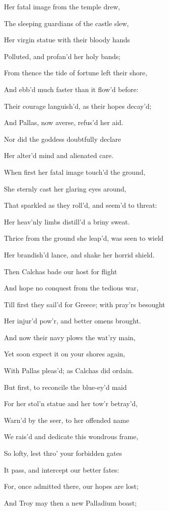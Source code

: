 Her fatal image from the temple drew,

The sleeping guardians of the castle slew,

Her virgin statue with their bloody hands

Polluted, and profan’d her holy bands;

From thence the tide of fortune left their shore,

And ebb’d much faster than it flow’d before:

Their courage languish’d, as their hopes decay’d;

And Pallas, now averse, refus’d her aid.

Nor did the goddess doubtfully declare

Her alter’d mind and alienated care.

When first her fatal image touch’d the ground,

She sternly cast her glaring eyes around,

That sparkled as they roll’d, and seem’d to threat:

Her heav’nly limbs distill’d a briny sweat.

Thrice from the ground she leap’d, was seen to wield

Her brandish’d lance, and shake her horrid shield.

Then Calchas bade our host for flight

And hope no conquest from the tedious war,

Till first they sail’d for Greece; with pray’rs besought

Her injur’d pow’r, and better omens brought.

And now their navy plows the wat’ry main,

Yet soon expect it on your shores again,

With Pallas pleas’d; as Calchas did ordain.

But first, to reconcile the blue-ey’d maid

For her stol’n statue and her tow’r betray’d,

Warn’d by the seer, to her offended name

We rais’d and dedicate this wondrous frame,

So lofty, lest thro’ your forbidden gates

It pass, and intercept our better fates:

For, once admitted there, our hopes are lost;

And Troy may then a new Palladium boast;


